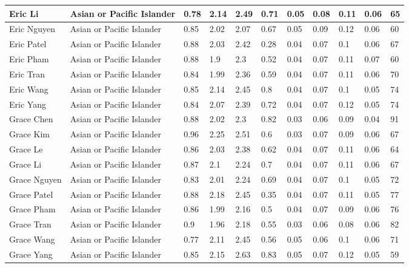 \begin{table}[!ht]
\begin{tabular}{|l|l|l|l|l|l|l|l|l|l|l|}
        Eric Li & Asian or Pacific Islander & 0.78 & 2.14 & 2.49 & 0.71 & 0.05 & 0.08 & 0.11 & 0.06 & 65 \\ \hline
        Eric Nguyen & Asian or Pacific Islander & 0.85 & 2.02 & 2.07 & 0.67 & 0.05 & 0.09 & 0.12 & 0.06 & 60 \\ \hline
        Eric Patel & Asian or Pacific Islander & 0.88 & 2.03 & 2.42 & 0.28 & 0.04 & 0.07 & 0.1 & 0.06 & 67 \\ \hline
        Eric Pham & Asian or Pacific Islander & 0.88 & 1.9 & 2.3 & 0.52 & 0.04 & 0.07 & 0.11 & 0.07 & 60 \\ \hline
        Eric Tran & Asian or Pacific Islander & 0.84 & 1.99 & 2.36 & 0.59 & 0.04 & 0.07 & 0.11 & 0.06 & 70 \\ \hline
        Eric Wang & Asian or Pacific Islander & 0.85 & 2.14 & 2.45 & 0.8 & 0.04 & 0.07 & 0.1 & 0.05 & 74 \\ \hline
        Eric Yang & Asian or Pacific Islander & 0.84 & 2.07 & 2.39 & 0.72 & 0.04 & 0.07 & 0.12 & 0.05 & 74 \\ \hline
        Grace Chen & Asian or Pacific Islander & 0.88 & 2.02 & 2.3 & 0.82 & 0.03 & 0.06 & 0.09 & 0.04 & 91 \\ \hline
        Grace Kim & Asian or Pacific Islander & 0.96 & 2.25 & 2.51 & 0.6 & 0.03 & 0.07 & 0.09 & 0.06 & 67 \\ \hline
        Grace Le & Asian or Pacific Islander & 0.86 & 2.03 & 2.38 & 0.62 & 0.04 & 0.07 & 0.11 & 0.06 & 64 \\ \hline
        Grace Li & Asian or Pacific Islander & 0.87 & 2.1 & 2.24 & 0.7 & 0.04 & 0.07 & 0.11 & 0.06 & 67 \\ \hline
        Grace Nguyen & Asian or Pacific Islander & 0.83 & 2.01 & 2.24 & 0.69 & 0.04 & 0.07 & 0.1 & 0.05 & 72 \\ \hline
        Grace Patel & Asian or Pacific Islander & 0.88 & 2.18 & 2.45 & 0.35 & 0.04 & 0.07 & 0.11 & 0.05 & 77 \\ \hline
        Grace Pham & Asian or Pacific Islander & 0.86 & 1.99 & 2.16 & 0.5 & 0.04 & 0.07 & 0.09 & 0.06 & 76 \\ \hline
        Grace Tran & Asian or Pacific Islander & 0.9 & 1.96 & 2.18 & 0.55 & 0.03 & 0.06 & 0.08 & 0.06 & 82 \\ \hline
        Grace Wang & Asian or Pacific Islander & 0.77 & 2.11 & 2.45 & 0.56 & 0.05 & 0.06 & 0.1 & 0.06 & 71 \\ \hline
        Grace Yang & Asian or Pacific Islander & 0.85 & 2.15 & 2.63 & 0.83 & 0.05 & 0.07 & 0.12 & 0.05 & 59 \\ \hline

\end{tabular}
\end{table}
